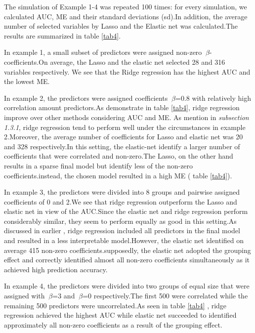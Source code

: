 \documentclass[12pt]{report}
\begin{document}
{\small The simulation of Example 1-4 was repeated 100 times: for every simulation, we calculated AUC, ME and their standard deviations (sd).In addition, the average number of selected variables by Lasso and  the Elastic net was calculated.The results are summarized in table \ref{tab4}.
	
	In example 1, a small subset of predictors were assigned non-zero $\ \beta$-coefficients.On average, the Lasso and the elastic net  selected 28 and 316 variables respectively. We  see that the Ridge regression has the highest AUC and the lowest ME.
	
	In example 2, the predictors were assigned coefficients $\ \beta$=0.8 with relatively high correlation amount predictors.As demonstrate in table \ref{tab4}, ridge regression improve over other methods considering AUC and ME. As mention in \textit{subsection 1.3.1}, ridge regression tend to perform well under the circumstances in example 2.Moreover, the average number of coefficients for Lasso and elastic net was 20 and 328 respectively.In this setting, the elastic-net identify a larger number of coefficients that were correlated and non-zero.The Lasso, on the other hand results in a sparse final model but identify less of the non-zero coefficients.instead, the chosen model resulted in a high ME ( table \ref{tab4}).
	
	In example 3, the predictors were divided into 8 groups and pairwise assigned coefficients of 0 and 2.We see that ridge regression outperform the Lasso and elastic net in view of the AUC.Since the elastic net and ridge regression perform considerably similar, they seem to perform equally as good in this setting.As discussed in earlier , ridge regression included all predictors in the final model and resulted in a less interpretable model.However, the elastic net identified on average 415 non-zero coefficients.supposedly, the elastic net adopted the grouping effect and correctly identified almost all non-zero coefficients simultaneously as it achieved high prediction accuracy.
	
	In example 4, the predictors were divided into two groups of equal size that were assigned with $\ \beta$=3 and $\ \beta$=0 respectively.The first 500 were correlated while the remaining 500 predictors were uncorrelated.As seen in table \ref{tab4} , ridge regression achieved the highest AUC  while elastic net succeeded to identified approximately all non-zero coefficients as a result of the grouping effect.
}
\end{document}
